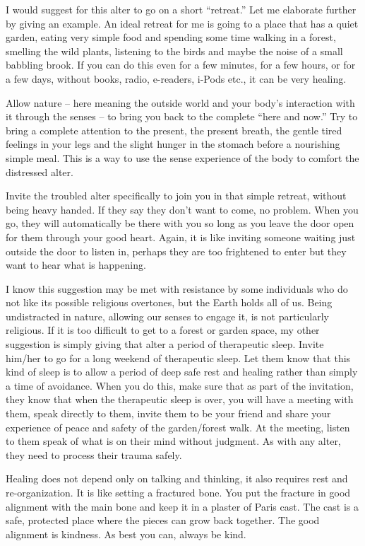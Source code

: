 \documentclass[]{book}
\begin{document}
I would suggest for this alter to go on a short ``retreat.'' Let me elaborate further by giving an example. An ideal retreat for me is going to a place that has a quiet garden, eating very simple food and spending some time walking in a forest, smelling the wild plants, listening to the birds and maybe the noise of a small babbling brook. If you can do this even for a few minutes, for a few hours, or for a few days, without books, radio, e-readers, i-Pods etc., it can be very healing.

Allow nature -- here meaning the outside world and your body's interaction with it through the senses -- to bring you back to the complete ``here and now.'' Try to bring a complete attention to the present, the present breath, the gentle tired feelings in your legs and the slight hunger in the stomach before a nourishing simple meal. This is a way to use the sense experience of the body to comfort the distressed alter.

Invite the troubled alter specifically to join you in that simple retreat, without being heavy handed. If they say they don't want to come, no problem. When you go, they will automatically be there with you so long as you leave the door open for them through your good heart. Again, it is like inviting someone waiting just outside the door to listen in, perhaps they are too frightened to enter but they want to hear what is happening.

I know this suggestion may be met with resistance by some individuals who do not like its possible religious overtones, but the Earth holds all of us. Being undistracted in nature, allowing our senses to engage it, is not particularly religious.
If it is too difficult to get to a forest or garden space, my other suggestion is simply giving that alter a period of therapeutic sleep. Invite him/her to go for a long weekend of therapeutic sleep. Let them know that this kind of sleep is to allow a period of deep safe rest and healing rather than simply a time of avoidance. When you do this, make sure that as part of the invitation, they know that when the therapeutic sleep is over, you will have a meeting with them, speak directly to them, invite them to be your friend and share your experience of peace and safety of the garden/forest walk. At the meeting, listen to them speak of what is on their mind without judgment. As with any alter, they need to process their trauma safely.

Healing does not depend only on talking and thinking, it also requires rest and re-organization. It is like setting a fractured bone. You put the fracture in good alignment with the main bone and keep it in a plaster of Paris cast. The cast is a safe, protected place where the pieces can grow back together. The good alignment is kindness. As best you can, always be kind.
\end{document}
